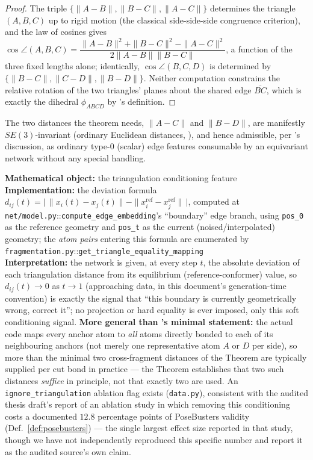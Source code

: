 \documentclass[11pt,a4paper]{report}
\theoremstyle{definition}
\theoremstyle{remark}
\newcommand{\file}[1]{\texttt{#1}}
\newcommand{\pyfunc}[1]{\texttt{#1}}
\begin{document}
\begin{proof}
The triple $\{\|A-B\|,\|B-C\|,\|A-C\|\}$ determines the triangle $(A,B,C)$
up to rigid motion (the classical side-side-side congruence criterion), and
the law of cosines gives
$\cos\angle(A,B,C) = \dfrac{\|A-B\|^2+\|B-C\|^2-\|A-C\|^2}{2\|A-B\|\|B-C\|}$,
a function of the three fixed lengths alone; identically,
$\cos\angle(B,C,D)$ is determined by $\{\|B-C\|,\|C-D\|,\|B-D\|\}$. Neither
computation constrains the relative rotation of the two triangles' planes
about the shared edge $\overline{BC}$, which is exactly the dihedral
$\phi_{ABCD}$ by 's definition.
\end{proof}

The two distances the theorem needs, $\|A-C\|$ and $\|B-D\|$, are
manifestly $SE(3)$-invariant (ordinary Euclidean distances,
), and hence admissible, per
's discussion, as ordinary type-$0$
(scalar) edge features consumable by an equivariant network without any
special handling.

\begin{codebox}
\textbf{Mathematical object:} the triangulation conditioning feature \\
\textbf{Implementation:} the deviation formula
$d_{ij}(t) = \bigl|\,\|x_i(t)-x_j(t)\| - \|x_i^{\mathrm{ref}}-x_j^{\mathrm{ref}}\|\,\bigr|$,
computed at \file{net/model.py}::\pyfunc{compute\_edge\_embedding}'s
``boundary'' edge branch, using \texttt{pos\_0} as the reference geometry
and \texttt{pos\_t} as the current (noised/interpolated) geometry; the
\emph{atom pairs} entering this formula are enumerated by
\file{fragmentation.py}::\pyfunc{get\_triangle\_equality\_mapping} \\
\textbf{Interpretation:} the network is given, at every step $t$, the
absolute deviation of each triangulation distance from its equilibrium
(reference-conformer) value, so $d_{ij}(t)\to0$ as $t\to1$ (approaching
data, in this document's generation-time convention) is exactly the signal
that ``this boundary is currently geometrically wrong, correct it''; no
projection or hard equality is ever imposed, only this soft conditioning
signal. \textbf{More general than 's
minimal statement:} the actual code maps every anchor atom to \emph{all}
atoms directly bonded to each of its neighbouring anchors (not merely one
representative atom $A$ or $D$ per side), so more than the minimal two
cross-fragment distances of the Theorem are typically supplied per cut
bond in practice --- the Theorem establishes that two such distances
\emph{suffice} in principle, not that exactly two are used. An
\texttt{ignore\_triangulation} ablation flag exists
(\file{data.py}), consistent with the audited thesis draft's report of an
ablation study in which removing this conditioning costs a documented
$12.8$ percentage points of PoseBusters validity (Def.~\ref{def:posebusters})
--- the single largest effect size reported in that study, though we have
not independently reproduced this specific number and report it as the
audited source's own claim.
\end{codebox}
\end{document}
